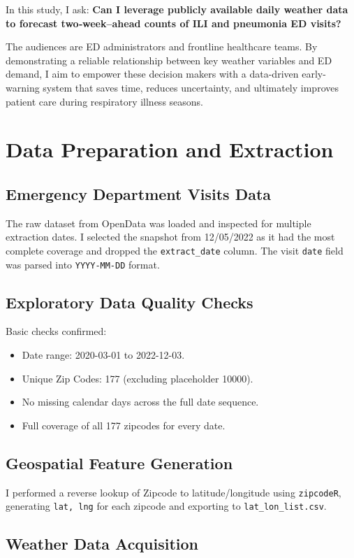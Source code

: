 \documentclass[11pt]{article}
\begin{document}
In this study, I ask: \textbf{Can I leverage publicly available daily weather data to forecast two‐week–ahead counts of ILI and pneumonia ED visits?}

The audiences are ED administrators and frontline healthcare teams. By demonstrating a reliable relationship between key weather variables and ED demand, I aim to empower these decision makers with a data-driven early-warning system that saves time, reduces uncertainty, and ultimately improves patient care during respiratory illness seasons.  


\section{Data Preparation and Extraction}

\subsection{Emergency Department Visits Data}
The raw dataset from OpenData was loaded and inspected for multiple extraction dates. I selected the snapshot from 12/05/2022 as it had the most complete coverage and dropped the \texttt{extract\_date} column. The visit \texttt{date} field was parsed into \texttt{YYYY-MM-DD} format.

\subsection{Exploratory Data Quality Checks}
Basic checks confirmed:
\begin{itemize}[nosep]
  \item Date range: 2020-03-01 to 2022-12-03.
  \item Unique Zip Codes: 177 (excluding placeholder 10000).
  \item No missing calendar days across the full date sequence.
  \item Full coverage of all 177 zipcodes for every date.
\end{itemize}

\subsection{Geospatial Feature Generation}
I performed a reverse lookup of Zipcode to latitude/longitude using \texttt{zipcodeR}, generating \texttt{lat, lng} for each zipcode and exporting to \texttt{lat\_lon\_list.csv}.

\subsection{Weather Data Acquisition}
\end{document}
